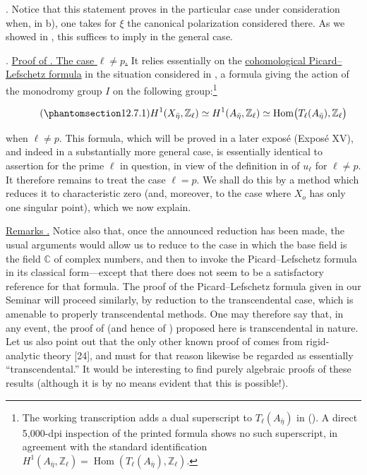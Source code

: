 \medskip
\noindent
{}. Notice that this statement proves  in the particular case
under consideration when, in  b), one takes for $\xi$ the canonical
polarization considered there. As we showed in , this suffices to
imply  in the general case.

\medskip
\noindent
{}. \underline{Proof of . The case $\ell\ne p$.} It relies
essentially on the \underline{cohomological Picard--Lefschetz formula}
in the situation considered in , a formula giving the action of the
monodromy group $I$ on the following group:\footnote{The working
transcription adds a dual superscript to $T_\ell(A_{\bar\eta})$ in
(). A direct 5,000-dpi inspection of the printed formula shows no
such superscript, in agreement with the standard identification
$H^1(A_{\bar\eta},\mathbb Z_\ell)=
\operatorname{Hom}(T_\ell(A_{\bar\eta}),\mathbb Z_\ell)$.}

\begin{equation}\tag{\SGARefTarget{sga7.sga7i.eix.n12-7-1}{12.7.1}}
 H^1(X_{\bar\eta},\mathbb Z_\ell)
 \simeq H^1(A_{\bar\eta},\mathbb Z_\ell)
 \simeq\operatorname{Hom}
   \bigl(T_\ell(A_{\bar\eta}),\mathbb Z_\ell\bigr)
\end{equation}

\noindent
when $\ell\ne p$. This formula, which will be proved in a later expos\'e
(Expos\'e XV), and indeed in a substantially more general case, is
essentially identical to assertion  for the prime $\ell$ in
question, in view of the definition in  of $u_\ell$ for $\ell\ne p$.
It therefore remains to treat the case $\ell=p$. We shall do this by a
method which reduces it to characteristic zero (and, moreover, to the
case where $X_o$ has only one singular point), which we now explain.

\medskip
\noindent
\underline{Remarks .} Notice also that, once the announced
reduction has been made, the usual arguments would allow us to reduce to
the case in which the base field is the field $\mathbb C$ of complex
numbers, and then to invoke the Picard--Lefschetz formula in its classical
form---except that there does not seem to be a satisfactory reference
for that formula. The proof of the Picard--Lefschetz formula given in our
Seminar will proceed similarly, by reduction to the transcendental case,
which is amenable to properly transcendental methods. One may therefore
say that, in any event, the proof of  (and hence of ) proposed
here is transcendental in nature. Let us also point out that the only
other known proof of  comes from rigid-analytic theory [24], and must
for that reason likewise be regarded as essentially ``transcendental.''
It would be interesting to find purely algebraic proofs of these results
(although it is by no means evident that this is possible!).
